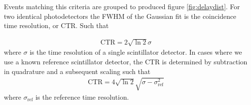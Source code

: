 Events matching this criteria are grouped to produced figure \ref{fig:delaydist}. For two identical photodetectors the FWHM of the Gaussian fit is the coincidence time resolution, or CTR. Such that

\begin{align}
\text{CTR} = 2\sqrt{\ln{2}}\sigma
\end{align}
where $\sigma$ is the time resolution of a single scintillator detector. In cases where we use a known reference scintillator detector, the CTR is determined by subtraction in quadrature and a subsequent scaling such that
\begin{align}
\text{CTR} = 4\sqrt{\ln{2}}\sqrt{\sigma-\sigma_\textrm{ref}^2}
\end{align}
where $\sigma_\text{ref}$ is the reference time resolution.